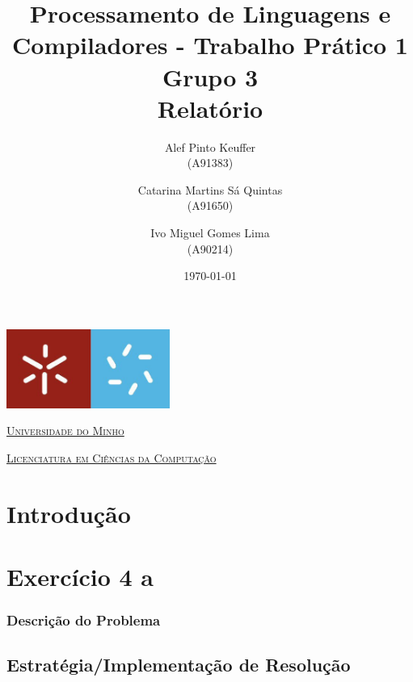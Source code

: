 \documentclass[11pt,a4paper]{report}
\title{Processamento de Linguagens e Compiladores - Trabalho Prático 1\\
       \textbf{Grupo 3}\\ Relatório
       } %
\author{Alef Pinto Keuffer\\ (A91383)\and Catarina Martins Sá Quintas\\ (A91650)\and  Ivo Miguel Gomes Lima \\(A90214)
       } %
\date{\today} %
\begin{document}
	\begin{minipage}{0.9\linewidth}
        \centering
		\includegraphics[width=0.4\textwidth]{um.jpeg}\par\vspace{1cm}
                \href{https://www.uminho.pt/PT}
		{\scshape\LARGE Universidade do Minho} \par
		\vspace{0.6cm}
                \href{https://lcc.di.uminho.pt}
		{\scshape\Large Licenciatura em Ciências da Computação} \par
		\maketitle
	\end{minipage}

\tableofcontents %

\chapter{Introdução}


\chapter{Exercício 4 a}

\subsection{Descrição do Problema}


\section{Estratégia/Implementação de Resolução}
\end{document}
